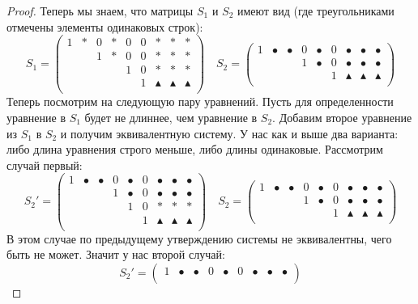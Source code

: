 \begin{proof}
Теперь мы знаем, что матрицы $S_1$ и $S_2$ имеют вид (где треугольниками отмечены элементы одинаковых строк):
\[
S_1 = 
\begin{pmatrix}
{1}&{*}&{0}&{*}&{0}&{0}&{*}&{*}&{*}\\
{}&{}&{1}&{*}&{0}&{0}&{*}&{*}&{*}\\
{}&{}&{}&{}&{1}&{0}&{*}&{*}&{*}\\
{}&{}&{}&{}&{}&{1}&{\blacktriangle}&{\blacktriangle}&{\blacktriangle}\\
\end{pmatrix}\quad
S_2 = 
\begin{pmatrix}
{1}&{\bullet}&{\bullet}&{0}&{\bullet}&{0}&{\bullet}&{\bullet}&{\bullet}\\
{}&{}&{}&{1}&{\bullet}&{0}&{\bullet}&{\bullet}&{\bullet}\\
{}&{}&{}&{}&{}&{1}&{\blacktriangle}&{\blacktriangle}&{\blacktriangle}\\
\end{pmatrix}
\]
Теперь посмотрим на следующую пару уравнений.
Пусть для определенности уравнение в $S_1$ будет не длиннее, чем уравнение в $S_2$.
Добавим второе уравнение из $S_1$ в $S_2$ и получим эквивалентную систему.
У нас как и выше два варианта: либо длина уравнения строго меньше, либо длины одинаковые.
Рассмотрим случай первый:
\[
S_2' = 
\begin{pmatrix}
{1}&{\bullet}&{\bullet}&{0}&{\bullet}&{0}&{\bullet}&{\bullet}&{\bullet}\\
{}&{}&{}&{1}&{\bullet}&{0}&{\bullet}&{\bullet}&{\bullet}\\
{}&{}&{}&{}&{1}&{0}&{*}&{*}&{*}\\
{}&{}&{}&{}&{}&{1}&{\blacktriangle}&{\blacktriangle}&{\blacktriangle}\\
\end{pmatrix}\quad
S_2 = 
\begin{pmatrix}
{1}&{\bullet}&{\bullet}&{0}&{\bullet}&{0}&{\bullet}&{\bullet}&{\bullet}\\
{}&{}&{}&{1}&{\bullet}&{0}&{\bullet}&{\bullet}&{\bullet}\\
{}&{}&{}&{}&{}&{1}&{\blacktriangle}&{\blacktriangle}&{\blacktriangle}\\
\end{pmatrix}
\]
В этом случае по предыдущему утверждению системы не эквивалентны, чего быть не может.
Значит у нас второй случай:
\[
S_2' = 
\begin{pmatrix}
{1}&{\bullet}&{\bullet}&{0}&{\bullet}&{0}&{\bullet}&{\bullet}&{\bullet}\\

\end{pmatrix}\]
\end{proof}
